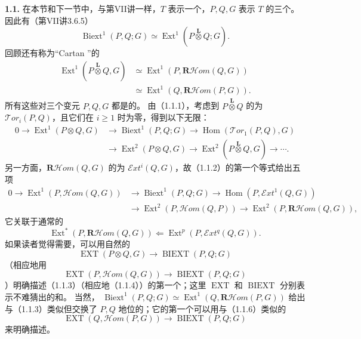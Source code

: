 \textbf{1.1.} 在本节和下一节中，与第VII讲一样，$T$ 表示一个，$P,Q,G$ 表示 $T$ 的三个。因此有（第VII讲3.6.5）
\[\operatorname{Biext}^1(P,Q;G)\simeq\operatorname{Ext}^1(P\mathbin{\overset{\mathbf L}{\otimes}}Q;G).\tag{1.1.1}\]
回顾还有称为“Cartan ”的
\[\begin{split}
\operatorname{Ext}^1(P\mathbin{\overset{\mathbf L}{\otimes}}Q,G)
&\simeq\operatorname{Ext}^1(P,\mathbf R\mathcal Hom(Q,G))\\
&\simeq\operatorname{Ext}^1(Q,\mathbf R\mathcal Hom(P,G)).
\end{split}\tag{1.1.2}\]
所有这些对三个变元 $P,Q,G$ 都是的。
由（1.1.1），考虑到 $P\mathbin{\overset{\mathbf L}{\otimes}}Q$ 的为 $\mathcal Tor_i(P,Q)$，且它们在 $i\geq1$ 时为零，得到以下无限：
\[\begin{split}
0\longrightarrow\operatorname{Ext}^1(P\otimes Q,G)&\longrightarrow\operatorname{Biext}^1(P,Q;G)
\longrightarrow\operatorname{Hom}(\mathcal Tor_1(P,Q),G)\\
&\longrightarrow\operatorname{Ext}^2(P\otimes Q,G)
\longrightarrow\operatorname{Ext}^2(P\mathbin{\overset{\mathbf L}{\otimes}}Q,G)\longrightarrow\cdots .
\end{split}\tag{1.1.3}\]
另一方面，$\mathbf R\mathcal Hom(Q,G)$ 的为 $\mathcal Ext^i(Q,G)$，故（1.1.2）的第一个等式给出五项
\[\begin{split}
0\longrightarrow\operatorname{Ext}^1(P,\mathcal Hom(Q,G))&\longrightarrow\operatorname{Biext}^1(P,Q;G)
\longrightarrow\operatorname{Hom}(P,\mathcal Ext^1(Q,G))\\
&\longrightarrow\operatorname{Ext}^2(P,\mathcal Hom(Q,P))
\longrightarrow\operatorname{Ext}^2(P,\mathbf R\mathcal Hom(Q,G)),
\end{split}\tag{1.1.4}\]
它关联于通常的
\[\operatorname{Ext}^*(P,\mathbf R\mathcal Hom(Q,G))\Longleftarrow
\operatorname{Ext}^p(P,\mathcal Ext^q(Q,G)).\]
如果读者觉得需要，可以用自然的
\[\operatorname{EXT}(P\otimes Q,G)\longrightarrow\operatorname{BIEXT}(P,Q;G)\tag{1.1.5}\]
（相应地用
\[\operatorname{EXT}(P,\mathcal Hom(Q,G))\longrightarrow\operatorname{BIEXT}(P,Q;G)\tag{1.1.6}\]
）明确描述（1.1.3）（相应地（1.1.4））的第一个；这里 $\operatorname{EXT}$ 和 $\operatorname{BIEXT}$ 分别表示不难猜出的和。
当然， $\operatorname{Biext}^1(P,Q;G)\simeq\operatorname{Ext}^1(Q,\mathbf R\mathcal Hom(P,G))$ 给出与（1.1.3）类似但交换了 $P,Q$ 地位的；它的第一个可以用与（1.1.6）类似的
\[\operatorname{EXT}(Q,\mathcal Hom(P,G))\longrightarrow\operatorname{BIEXT}(P,Q;G)\tag{1.1.7}\]
来明确描述。

